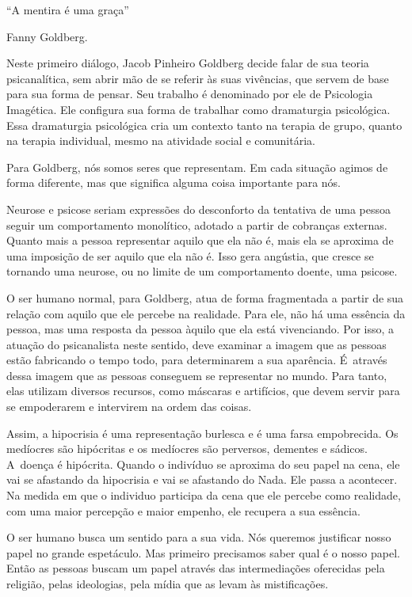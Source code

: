 \newcommand\abrefala{\begingroup\parindent0pt \setlength{\parskip}{6pt plus 3pt}}
\newcommand\fechafala{\endgroup}

 \epigraph{``A mentira é uma graça''}{Fanny Goldberg.} 

 

Neste primeiro diálogo, Jacob Pinheiro Goldberg decide falar de sua
teoria psicanalítica, sem abrir mão de se referir às suas vivências, que
servem de base para sua forma de pensar. Seu trabalho é denominado por
ele de Psicologia Imagética. Ele configura sua forma de trabalhar como
dramaturgia psicológica. Essa dramaturgia psicológica cria um contexto
tanto na terapia de grupo, quanto na terapia individual, mesmo na
atividade social e comunitária.

Para Goldberg, nós somos seres que representam. Em cada situação agimos
de forma diferente, mas que significa alguma coisa importante para nós.

Neurose e psicose seriam expressões do desconforto da tentativa de uma
pessoa seguir um comportamento monolítico, adotado a partir de cobranças
externas. Quanto mais a pessoa representar aquilo que ela não é, mais
ela se aproxima de uma imposição de ser aquilo que ela não é. Isso gera
angústia, que cresce se tornando uma neurose, ou no limite de um
comportamento doente, uma psicose.

O ser humano normal, para Goldberg, atua de forma fragmentada a partir
de sua relação com aquilo que ele percebe na realidade. Para ele, não há
uma essência da pessoa, mas uma resposta da pessoa àquilo que ela está
vivenciando. Por isso, a atuação do psicanalista neste sentido, deve
examinar a imagem que as pessoas estão fabricando o tempo todo, para
determinarem a sua aparência. É~através dessa imagem que as pessoas
conseguem se representar no mundo. Para tanto, elas utilizam diversos
recursos, como máscaras e artifícios, que devem servir para se
empoderarem e intervirem na ordem das coisas.

Assim, a hipocrisia é uma representação burlesca e é uma farsa
empobrecida. Os medíocres são hipócritas e os medíocres são perversos,
dementes e sádicos. A~doença é hipócrita. Quando o indivíduo se aproxima
do seu papel na cena, ele vai se afastando da hipocrisia e vai se
afastando do Nada. Ele passa a acontecer. Na medida em que o individuo
participa da cena que ele percebe como realidade, com uma maior
percepção e maior empenho, ele recupera a sua essência.

O ser humano busca um sentido para a sua vida. Nós queremos justificar
nosso papel no grande espetáculo. Mas primeiro precisamos saber qual é o
nosso papel. Então as pessoas buscam um papel através das intermediações
oferecidas pela religião, pelas ideologias, pela mídia que as levam às
mistificações.

